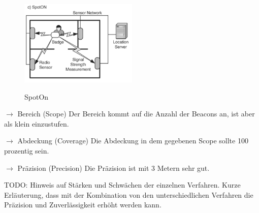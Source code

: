 \begin{figure}[h]
\centering
\includegraphics[width=0.5\textwidth]{ref/images/SpotOn.PNG}
\caption[SpotOn]{SpotOn}
\label{fig:SpotOn}
\cite[S. 201]{Schiller2004}
\end{figure}


$\longrightarrow$ Bereich (Scope) Der Bereich kommt auf die Anzahl der Beacons an, ist aber als klein einzustufen.

$\longrightarrow$ Abdeckung (Coverage) Die Abdeckung in dem gegebenen Scope sollte 100 prozentig sein.

$\longrightarrow$ Präzision (Precision) Die Präzision ist mit 3 Metern sehr gut. 


TODO:
Hinweis auf Stärken und Schwächen der einzelnen Verfahren. Kurze Erläuterung, dass mit der Kombination von den unterschiedlichen Verfahren die Präzision und Zuverlässigkeit erhöht werden kann.